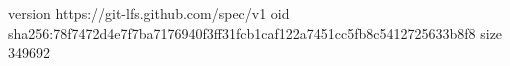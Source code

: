version https://git-lfs.github.com/spec/v1
oid sha256:78f7472d4e7f7ba7176940f3ff31fcb1caf122a7451cc5fb8c5412725633b8f8
size 349692

